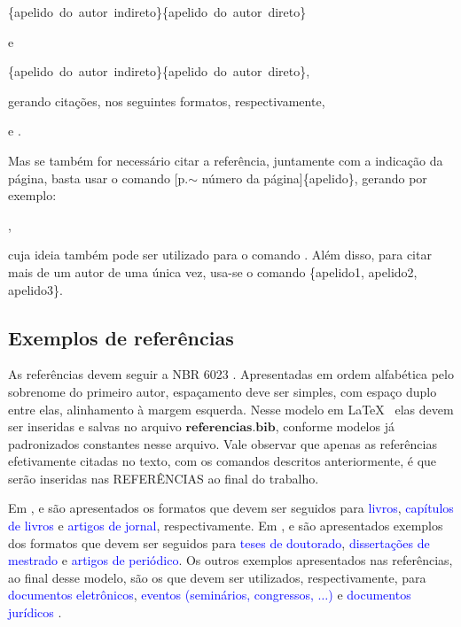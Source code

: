 \documentclass{sep}
\begin{document}
\begin{center}
  \{apelido~do~autor~indireto\}\{apelido~do~autor~direto\}

  e

  \{apelido~do~autor~indireto\}\{apelido~do~autor~direto\},
\end{center}

\noindent gerando citações, nos seguintes formatos, respectivamente,

\begin{center}
   e .
\end{center}

Mas se também for necessário citar a referência, juntamente com a indicação da página, basta usar o comando [p.$\sim$ número da página]\{apelido\}, gerando por exemplo:

\begin{center}
 \cite[p.~34]{alves},
\end{center}

\noindent cuja ideia também pode ser utilizado para o comando .
Além disso, para citar mais de um autor de uma única vez, usa-se o comando \{apelido1, apelido2, apelido3\}.

\subsection{Exemplos de referências}

As referências devem seguir a NBR 6023 \cite{NBR6023}.
Apresentadas em ordem alfabética pelo sobrenome do primeiro autor, espaçamento deve ser simples, com espaço duplo entre elas, alinhamento à margem esquerda.
Nesse modelo em \LaTeX~ elas devem ser inseridas e salvas no arquivo $\textbf{referencias.bib}$, conforme modelos já padronizados constantes nesse arquivo.
Vale observar que apenas as referências efetivamente citadas no texto, com os comandos descritos anteriormente, é que serão inseridas nas REFERÊNCIAS ao final do trabalho.

Em ,  e  são apresentados os formatos que devem ser seguidos para \textcolor{blue}{livros}, \textcolor{blue}{capítulos de livros} e \textcolor{blue}{artigos de jornal}, respectivamente.
Em ,  e  são apresentados exemplos dos formatos que devem ser seguidos para \textcolor{blue}{teses de doutorado}, \textcolor{blue}{dissertações de mestrado} e \textcolor{blue}{artigos de periódico}.
Os outros exemplos apresentados nas referências, ao final desse modelo, são os que devem ser utilizados, respectivamente, para \textcolor{blue}{documentos eletrônicos}, \textcolor{blue}{eventos (seminários, congressos, $\ldots$)} e \textcolor{blue}{documentos jurídicos} \cite{if, dam, bras}.
\end{document}
